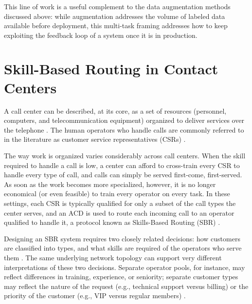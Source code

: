 \documentclass[12pt,a4paper,openright,twoside]{book}
\begin{document}
This line of work is a useful complement to the data augmentation methods discussed above:
while augmentation addresses the volume of labeled data available before
deployment, this multi-task framing addresses how to keep exploiting the
feedback loop of a system once it is in production.

\section{Skill-Based Routing in Contact Centers}
A call center can be described, at its core, as a set of resources (personnel,
computers, and telecommunication equipment) organized to deliver services over
the telephone \cite{gans2003telephone}. The human operators who handle calls
are commonly referred to in the literature as customer service representatives (CSRs) \cite{gans2003telephone, mazzuchi2004analyzing}.

The way work is organized varies considerably across call centers.
When the skill required to handle a call is low, a center can afford to
cross-train every CSR to handle every type of call, and calls can simply
be served first-come, first-served. As soon as the work becomes more specialized,
however, it is no longer economical (or even feasible) to train every operator on every task.
In these settings, each CSR is typically qualified for only a subset of the call types
the center serves, and an ACD is used to route each incoming call to an operator qualified to handle it,
a protocol known as Skills-Based Routing (SBR) \cite{gans2003telephone, garnett2000introduction, mazzuchi2004analyzing}.

Designing an SBR system requires two closely related decisions: how customers are classified into types,
and what skills are required of the operators who serve them \cite{garnett2000introduction}.
The same underlying network topology can support very different interpretations of these two decisions.
Separate operator pools, for instance, may reflect differences in training, experience, or seniority;
separate customer types may reflect the nature of the request (e.g., technical support versus billing)
or the priority of the customer (e.g., VIP versus regular members) \cite{garnett2000introduction}.
\end{document}
